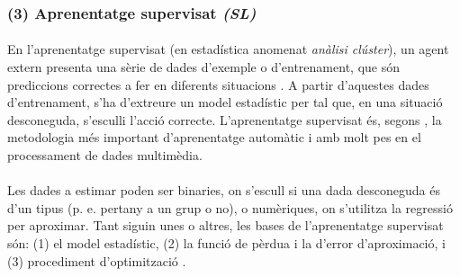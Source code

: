 \documentclass[12pt,a4paper,final,twoside]{article}
\begin{document}

\subsubsection*{(3) Aprenentatge supervisat \textit{(SL)}}

\paragraph{}En l'aprenentatge supervisat (en estadística anomenat \textit{anàlisi clúster}), un agent extern presenta una sèrie de dades d'exemple o d'entrenament, que són prediccions correctes a fer en diferents situacions \cite{Kober2009}. A partir d'aquestes dades d'entrenament, s'ha d'extreure un model estadístic per tal que, en una situació desconeguda, s'esculli l'acció correcte. L'aprenentatge supervisat és, segons \cite{Cord2008}, la metodologia més important d'aprenentatge automàtic i amb molt pes en el processament de dades multimèdia.

\paragraph{}Les dades a estimar poden ser binaries, on s'escull si una dada desconeguda és d'un tipus (p. e. pertany a un grup o no), o numèriques, on s'utilitza la regressió per aproximar. Tant siguin unes o altres, les bases de l'aprenentatge supervisat són: (1) el model estadístic, (2) la funció de pèrdua i la d'error d'aproximació, i (3) procediment d'optimització \cite{Alpaydin2004}.
\end{document}
